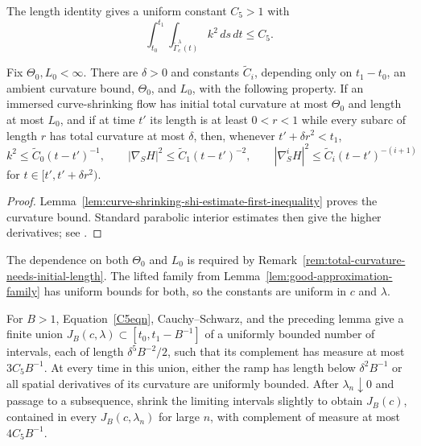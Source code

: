 The length identity gives a uniform constant $C_5>1$ with
\begin{equation}\label{C5eqn}
\int_{t_0}^{t_1}\int_{\widetilde\Gamma_c^\lambda(t)}k^2\,ds\,dt\le C_5.
\end{equation}

\begin{lemma}
\label{lem:curve-shrinking-shi-estimate}
\label{CSSHI}
Fix $\Theta_0,L_0<\infty$. There are $\delta>0$ and constants
$\widetilde C_i$, depending only on $t_1-t_0$, an ambient curvature bound,
$\Theta_0$, and $L_0$, with the following property. If an immersed
curve-shrinking flow has initial total curvature at most $\Theta_0$ and length
at most $L_0$, and if at time $t'$ its length is at least $0<r<1$ while every
subarc of length $r$ has total curvature at most $\delta$, then, whenever
$t'+\delta r^2<t_1$,
\[
k^2\le\widetilde C_0(t-t')^{-1},\qquad
|\nabla_SH|^2\le\widetilde C_1(t-t')^{-2},\qquad
|\nabla_S^iH|^2\le\widetilde C_i(t-t')^{-(i+1)}
\]
for $t\in[t',t'+\delta r^2)$.
\end{lemma}
\begin{proof}
\sketch Lemma~\ref{lem:curve-shrinking-shi-estimate-first-inequality} proves
the curvature bound. Standard parabolic interior estimates then give the
higher derivatives; see \cite{AG,Altschuler}.
\end{proof}

\begin{remark}
\label{rem:shi-constants-depend-on-initial-data}
The dependence on both $\Theta_0$ and $L_0$ is required by
Remark~\ref{rem:total-curvature-needs-initial-length}. The lifted family from
Lemma~\ref{lem:good-approximation-family} has uniform bounds for both, so the
constants are uniform in $c$ and $\lambda$.
\end{remark}

For $B>1$, Equation~\eqref{C5eqn}, Cauchy--Schwarz, and the preceding lemma
give a finite union $J_B(c,\lambda)\subset[t_0,t_1-B^{-1}]$ of a uniformly
bounded number of intervals, each of length $\delta^5B^{-2}/2$, such that its
complement has measure at most $3C_5B^{-1}$. At every time in this union,
either the ramp has length below $\delta^2B^{-1}$ or all spatial derivatives
of its curvature are uniformly bounded. After $\lambda_n\downarrow0$ and
passage to a subsequence, shrink the limiting intervals slightly to obtain
$J_B(c)$, contained in every $J_B(c,\lambda_n)$ for large $n$, with complement
of measure at most $4C_5B^{-1}$.

